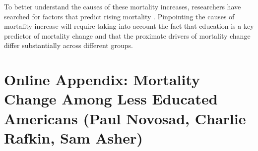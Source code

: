 \documentclass[12pt,letterpaper]{article}
\numberwithin{equation}{section}
\begin{document}
To better understand the causes of these mortality increases, researchers have searched for factors that predict rising mortality \citep{Cutler2011,Case2017,Ruhm2018}. Pinpointing the causes of mortality increase will require taking into account the fact that education is a key predictor of mortality change and that the proximate drivers of mortality change differ substantially across different groups.

\newpage
\singlespace

%




\floatbarrier
\clearpage

\floatbarrier

\newpage
\section*{Online Appendix: Mortality Change Among Less Educated Americans (Paul Novosad, Charlie Rafkin, Sam Asher)}
\end{document}
